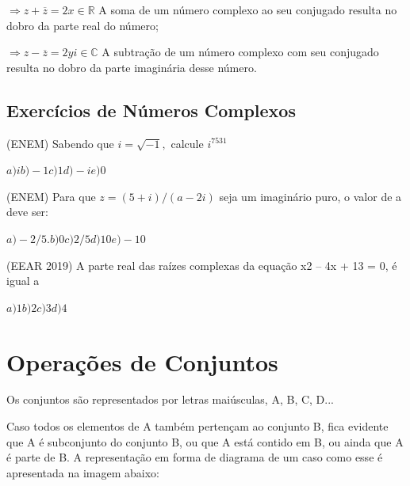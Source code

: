 \begin{multicols*}{2}
	$\Rightarrow z + \overline{z} = 2 x \in \mathbb{R} $ A soma de um número complexo ao seu conjugado resulta no dobro da parte real do número;

	$\Rightarrow z - \overline{z} = 2yi \in \mathbb{C} $ A subtração de um número complexo com seu conjugado resulta no dobro da parte imaginária desse número.

	\subsection*{Exercícios de Números Complexos}


	\setcounter{numexercicio}{0}
	\execnum (ENEM) Sabendo que  $ i = \sqrt{-1}, $ calcule $ i^{7531}$

	$a)  i b) -1  c) 1  d) -i  e) 0$

	\execnum (ENEM) Para que $z = (5 + i)/(a - 2i)$ seja um imaginário puro, o valor de a deve ser:

	$a) -2/5.  b) 0 c) 2/5  d) 10   e) -10 $

	\execnum (EEAR 2019) A parte real das raízes complexas da equação x2  --  4x + 13 = 0, é igual a

	$ a) 1  b) 2  c) 3  d) 4 $



	\section*{Operações de Conjuntos}

	Os conjuntos são representados por letras maiúsculas, A, B, C, D...

	Caso todos os elementos de A também pertençam ao conjunto B, fica evidente que A é subconjunto do conjunto B, ou que A está contido em B, ou ainda que A é parte de B. A representação em forma de diagrama de um caso como esse é apresentada na imagem abaixo:


\end{multicols*}
